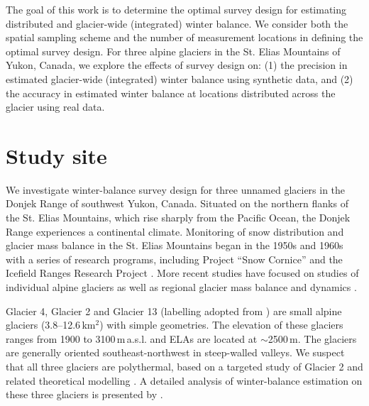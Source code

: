 \documentclass{article}
\begin{document}

The goal of this work is to determine the optimal survey design for estimating  distributed and glacier-wide (integrated) winter balance. We consider both the spatial sampling scheme and the number of measurement locations in defining the optimal survey design. For three alpine glaciers in the St. Elias Mountains of Yukon, Canada, we explore the effects of survey design  on: 
(1) the precision in estimated glacier-wide (integrated) winter balance using synthetic data, and  
(2) the accuracy in estimated winter balance at locations distributed across the glacier using real data. 




\section{Study site}

We investigate winter-balance survey design for three unnamed glaciers in the Donjek Range of southwest Yukon, Canada. Situated on the northern flanks of the St. Elias Mountains, which rise sharply from the Pacific Ocean, the Donjek Range experiences a continental climate. Monitoring of snow distribution and glacier mass balance in the St. Elias Mountains began in the 1950s and 1960s with a series of research programs, including Project ``Snow Cornice''  and the Icefield Ranges Research Project  \parencite{Wood1948, Danby2003}. More recent studies have focused on studies of individual alpine glaciers  \parencite[e.g.][]{Clarke2014,Flowers2014} as well as regional glacier mass balance and dynamics  \parencite[e.g.][]{Arendt2008, Burgess2013,Waechter2015}. 

Glacier 4, Glacier 2 and Glacier 13 (labelling adopted from \Textcite{Crompton2016}) are small alpine glaciers (3.8--12.6\,km$^2$) with simple geometries. The elevation of these glaciers ranges from 1900 to 3100\,m\,a.s.l. and ELAs are located at $\sim$2500\,m. The glaciers are generally oriented southeast-northwest in steep-walled valleys. We suspect that all three glaciers are polythermal, based on a targeted study of Glacier 2  \parencite{Wilson2013} and related theoretical modelling  \parencite{Wilson2013a}. A detailed analysis of winter-balance estimation on these three glaciers is presented by \Textcite{Pulwicki2017}.
\end{document}
